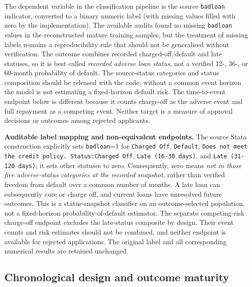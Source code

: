 \documentclass[10pt]{article}
\begin{document}
The dependent variable in the classification pipeline is the source \texttt{badloan} indicator, converted to a binary numeric label (with missing values filled with zero by the implementation). The available audits found no missing \texttt{badloan} values in the reconstructed mature training samples, but the treatment of missing labels remains a reproducibility rule that should not be generalised without verification. The outcome combines recorded charged-off/default and late statuses, so it is best called \emph{recorded adverse loan status}, not a verified 12-, 36-, or 60-month probability of default. The source-status categories and status composition should be released with the code; without a common event horizon the model is not estimating a fixed-horizon default risk. The time-to-event endpoint below is different because it counts charge-off as the adverse event and full repayment as a competing event. Neither target is a measure of approval decisions or outcomes among rejected applicants.

\noindent\textbf{Auditable label mapping and non-equivalent endpoints.} The source Stata construction explicitly sets \texttt{badloan}=1 for \texttt{Charged Off}, \texttt{Default}, \texttt{Does not meet the credit policy. Status:Charged Off}, \texttt{Late (16-30 days)}, and \texttt{Late (31-120 days)}; it sets other statuses to zero. Consequently, zero means \emph{not in those five adverse-status categories at the recorded snapshot}, rather than verified freedom from default over a common number of months. A late loan can subsequently cure or charge off, and current loans have unresolved future outcomes. This is a status-snapshot classifier on an outcome-selected population, not a fixed-horizon probability-of-default estimator. The separate competing-risk charge-off endpoint excludes the late-status composite by design. Their event counts and risk estimates should not be combined, and neither endpoint is available for rejected applications. The original label and all corresponding numerical results are retained unchanged.

\subsection{Chronological design and outcome maturity}
\end{document}
